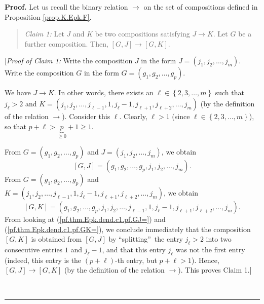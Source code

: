 \documentclass[numbers=enddot,12pt,final,onecolumn,notitlepage]{scrartcl}%
\theoremstyle{definition}
\newenvironment{statement}{\begin{quote}}{\end{quote}}
\newenvironment{proof}[1][Proof]{\noindent\textbf{#1.} }{\ \rule{0.5em}{0.5em}}
\newenvironment{verlong}{}{}
\begin{document}
\begin{verlong}
\begin{proof}
Let us recall the binary relation $\rightarrow$ on the set of compositions
defined in Proposition \ref{prop.K.Epk.F}.

\begin{statement}
\textit{Claim 1:} Let $J$ and $K$ be two compositions satisfying $J\rightarrow
K$. Let $G$ be a further composition. Then, $\left[  G,J\right]
\rightarrow\left[  G,K\right]  $.
\end{statement}

[\textit{Proof of Claim 1:} Write the composition $J$ in the form $J=\left(
j_{1},j_{2},\ldots,j_{m}\right)  $. Write the composition $G$ in the form
$G=\left(  g_{1},g_{2},\ldots,g_{p}\right)  $.

We have $J\rightarrow K$. In other words, there exists an $\ell\in\left\{
2,3,\ldots,m\right\}  $ such that $j_{\ell}>2$ and $K=\left(  j_{1}%
,j_{2},\ldots,j_{\ell-1},1,j_{\ell}-1,j_{\ell+1},j_{\ell+2},\ldots
,j_{m}\right)  $ (by the definition of the relation $\rightarrow$). Consider
this $\ell$. Clearly, $\ell>1$ (since $\ell\in\left\{  2,3,\ldots,m\right\}
$), so that $p+\ell>\underbrace{p}_{\geq0}+1\geq1$.

From $G=\left(  g_{1},g_{2},\ldots,g_{p}\right)  $ and $J=\left(  j_{1}%
,j_{2},\ldots,j_{m}\right)  $, we obtain%
\begin{equation}
\left[  G,J\right]  =\left(  g_{1},g_{2},\ldots,g_{p},j_{1},j_{2},\ldots
,j_{m}\right)  . \label{pf.thm.Epk.dend.c1.pf.GJ=}%
\end{equation}
From $G=\left(  g_{1},g_{2},\ldots,g_{p}\right)  $ and $K=\left(  j_{1}%
,j_{2},\ldots,j_{\ell-1},1,j_{\ell}-1,j_{\ell+1},j_{\ell+2},\ldots
,j_{m}\right)  $, we obtain%
\begin{equation}
\left[  G,K\right]  =\left(  g_{1},g_{2},\ldots,g_{p},j_{1},j_{2}%
,\ldots,j_{\ell-1},1,j_{\ell}-1,j_{\ell+1},j_{\ell+2},\ldots,j_{m}\right)  .
\label{pf.thm.Epk.dend.c1.pf.GK=}%
\end{equation}
From looking at (\ref{pf.thm.Epk.dend.c1.pf.GJ=}) and
(\ref{pf.thm.Epk.dend.c1.pf.GK=}), we conclude immediately that the
composition $\left[  G,K\right]  $ is obtained from $\left[  G,J\right]  $ by
\textquotedblleft splitting\textquotedblright\ the entry $j_{\ell}>2$ into two
consecutive entries $1$ and $j_{\ell}-1$, and that this entry $j_{\ell}$ was
not the first entry (indeed, this entry is the $\left(  p+\ell\right)  $-th
entry, but $p+\ell>1$). Hence, $\left[  G,J\right]  \rightarrow\left[
G,K\right]  $ (by the definition of the relation $\rightarrow$). This proves
Claim 1.]


\end{proof}
\end{verlong}
\end{document}
